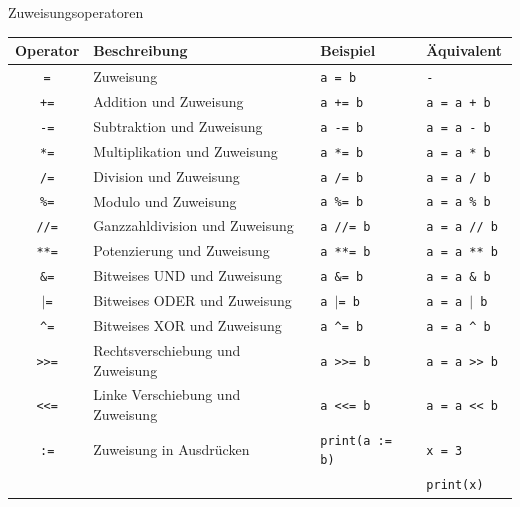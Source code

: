 \documentclass[xelatex,aspectratio=169]{beamer}
\begin{document}
\begin{frame}{Zuweisungsoperatoren}
  \vspace{-12pt}
  \begin{table}[]
    \small
    \begin{tabular}{clll}
      \toprule
      \textbf{Operator} & \textbf{Beschreibung}            & \textbf{Beispiel}      & \textbf{Äquivalent}          \\
      \midrule
      \texttt{=}        & Zuweisung                        & \texttt{a = b}         & \texttt{-           }        \\
      \texttt{+=}       & Addition und Zuweisung           & \texttt{a += b}        & \texttt{a = a + b   }        \\
      \texttt{-=}       & Subtraktion und Zuweisung        & \texttt{a -= b}        & \texttt{a = a - b   }        \\
      \texttt{*=}       & Multiplikation und Zuweisung     & \texttt{a *= b}        & \texttt{a = a * b   }        \\
      \texttt{/=}       & Division und Zuweisung           & \texttt{a /= b}        & \texttt{a = a / b   }        \\
      \texttt{\%=}      & Modulo und Zuweisung             & \texttt{a \%= b}       & \texttt{a = a \% b  }        \\
      \texttt{//=}      & Ganzzahldivision und Zuweisung   & \texttt{a //= b}       & \texttt{a = a // b  }        \\
      \texttt{**=}      & Potenzierung und Zuweisung       & \texttt{a **= b}       & \texttt{a = a ** b  }        \\
      \texttt{\&=}      & Bitweises UND und Zuweisung      & \texttt{a \&= b}       & \texttt{a = a \& b  }        \\
      \texttt{$|$=}     & Bitweises ODER und Zuweisung     & \texttt{a $|$= b}      & \texttt{a = a $|$ b }        \\
      \texttt{\^{}=}    & Bitweises XOR und Zuweisung      & \texttt{a \^{}= b}     & \texttt{a = a \^{} b}        \\
      \texttt{>>=}      & Rechtsverschiebung und Zuweisung & \texttt{a >>= b}       & \texttt{a = a >> b  }        \\
      \texttt{<<=}      & Linke Verschiebung und Zuweisung & \texttt{a <<= b}       & \texttt{a = a << b  }        \\
      \texttt{:=}       & Zuweisung in Ausdrücken          & \texttt{print(a := b)} & \texttt{x = 3           }    \\
                        &                                  &                        & \texttt{print(x)           } \\
      \bottomrule
    \end{tabular}
  \end{table}
\end{frame}
\end{document}
